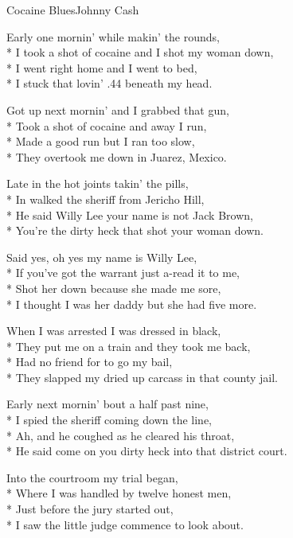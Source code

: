 \documentclass[10.5pt]{book}
\begin{document}
\begin{poem}{Cocaine Blues}{Johnny Cash}

\settowidth{\versewidth}{He said come on you dirty heck into that district court.}

Early one mornin' while makin' the rounds,\\*
I took a shot of cocaine and I shot my woman down,\\*
I went right home and I went to bed,\\*
I stuck that lovin' .44 beneath my head.

Got up next mornin' and I grabbed that gun,\\*
Took a shot of cocaine and away I run,\\*
Made a good run but I ran too slow,\\*
They overtook me down in Juarez, Mexico.

Late in the hot joints takin' the pills,\\*
In walked the sheriff from Jericho Hill,\\*
He said Willy Lee your name is not Jack Brown,\\*
You're the dirty heck that shot your woman down.

Said yes, oh yes my name is Willy Lee,\\*
If you've got the warrant just a-read it to me,\\*
Shot her down because she made me sore,\\*
I thought I was her daddy but she had five more.

When I was arrested I was dressed in black,\\*
They put me on a train and they took me back,\\*
Had no friend for to go my bail,\\*
They slapped my dried up carcass in that county jail.

Early next mornin' bout a half past nine,\\*
I spied the sheriff coming down the line,\\*
Ah, and he coughed as he cleared his throat,\\*
He said come on you dirty heck into that district court.

Into the courtroom my trial began,\\*
Where I was handled by twelve honest men,\\*
Just before the jury started out,\\*
I saw the little judge commence to look about.


\end{poem}
\end{document}
